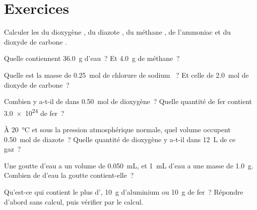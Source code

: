 \section{Exercices}

\begin{exercise}[$\star$]\label{exo:g10:the-mole:1}
Calculer les  du dioxygène , du diazote , du
méthane , de l'ammoniac  et du dioxyde de carbone
.
\end{exercise}

\begin{exercise}[$\star$]\label{exo:g10:the-mole:2}
Quelle  contiennent \qty{36.0}{g} d'eau~? Et
\qty{4.0}{g} de méthane~?
\end{exercise}

\begin{exercise}[$\star$]\label{exo:g10:the-mole:3}
Quelle est la masse de \qty{0.25}{mol} de chlorure de sodium ~?
Et celle de \qty{2.0}{mol} de dioxyde de carbone~?
\end{exercise}

\begin{exercise}[$\star$]\label{exo:g10:the-mole:4}
Combien y a-t-il de  dans \qty{0.50}{mol} de dioxygène~? Quelle
quantité de fer contient \num{3.0e24}  de fer~?
\end{exercise}

\begin{exercise}[$\star$]\label{exo:g10:the-mole:5}
À \qty{20}{\celsius} et sous la pression atmosphérique normale, quel
volume occupent \qty{0.50}{mol} de diazote~? Quelle quantité de
dioxygène y a-t-il dans \qty{12}{L} de ce gaz~?
\end{exercise}

\begin{exercise}[$\star\star$]\label{exo:g10:the-mole:6}
Une goutte d'eau a un volume de \qty{0.050}{mL}, et \qty{1}{mL} d'eau a
une masse de \qty{1.0}{g}. Combien de  d'eau la goutte
contient-elle~?
\end{exercise}

\begin{exercise}[$\star\star$]\label{exo:g10:the-mole:7}
Qu'est-ce qui contient le plus d', \qty{10}{g} d'aluminium ou
\qty{10}{g} de fer~? Répondre d'abord sans calcul, puis vérifier par le
calcul.
\end{exercise}

